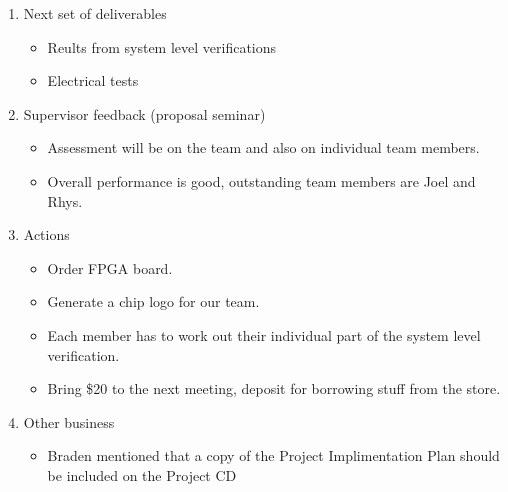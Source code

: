 \documentclass{article}
\begin{document}
\begin{flushleft}
\begin{enumerate}
  \item Next set of deliverables
    \begin{itemize}
    \item Reults from system level verifications
    \item Electrical tests
    \end{itemize}

  \item Supervisor feedback (proposal seminar)
    \begin{itemize}
    \item Assessment will be on the team and also on individual team members.
    \item Overall performance is good, outstanding team members are Joel
          and Rhys.
    \end{itemize}
  
  \item Actions
    \begin{itemize}
    \item Order FPGA board.
    \item Generate a chip logo for our team.
    \item Each member has to work out their individual part of the system
          level verification.
    \item Bring \$20 to the next meeting, deposit for borrowing stuff from
          the store.
    \end{itemize}

  \item Other business
    \begin{itemize}
    \item Braden mentioned that a copy of the Project Implimentation Plan
          should be included on the Project CD
    \end{itemize}
\end{enumerate}

\end{flushleft}
\end{document}
